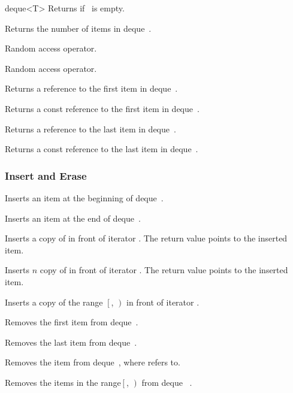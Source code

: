\begin{ccClassTemplate} {deque<T>}
	{Returns  if \ccVar\ is empty.}

	{Returns the number of items in deque~\ccVar.}

{Random access operator.}


\renewcommand{\ccTagRmTrailingConst}{\ccFalse}
{Random access operator.}
\renewcommand{\ccTagRmTrailingConst}{\ccTrue}


       {Returns a reference to the first item in deque~\ccVar.}

\renewcommand{\ccTagRmTrailingConst}{\ccFalse}
       {Returns a const reference to the first item in deque~\ccVar.}
\renewcommand{\ccTagRmTrailingConst}{\ccTrue}


       {Returns a reference to the last item in deque~\ccVar.}

\renewcommand{\ccTagRmTrailingConst}{\ccFalse}
       {Returns a const reference to the last item in deque~\ccVar.}
\renewcommand{\ccTagRmTrailingConst}{\ccTrue}


\subsubsection*{Insert and Erase}

       {Inserts an item at the beginning of deque~\ccVar.}

       {Inserts an item at the end of deque~\ccVar.}

 {Inserts a copy of  in front of iterator .
  The return value points to the inserted item.}

 {Inserts $n$ copy of  in front of iterator .
  The return value points to the inserted item.}


 {Inserts a copy of the range $\left[\right.$, $\left.\right)$
  in front of iterator .}

 {Removes the first item from deque~\ccVar.}

 {Removes the last item from deque~\ccVar.}

 {Removes the item from deque~\ccVar, where  refers to.}

 {Removes the items in the range$\left[\right.$, 
  $\left.\right)$ from deque ~\ccVar.}




\end{ccClassTemplate} 
